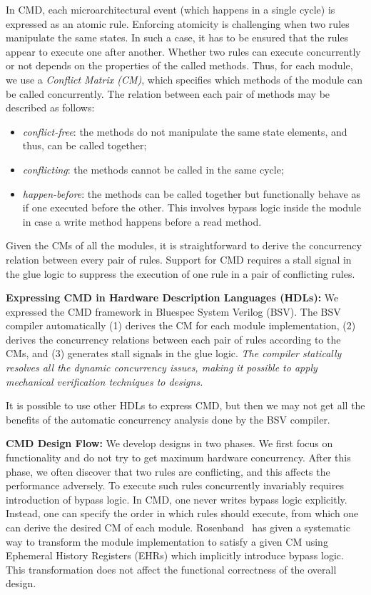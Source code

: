 \documentclass[conference]{IEEEtran}
\begin{document}
In CMD, each microarchitectural event (which happens in a single cycle) is expressed as an atomic rule.
Enforcing atomicity is challenging when two rules manipulate the same states.
In such a case, it has to be ensured that the rules appear to execute one after another.
Whether two rules can execute concurrently or not depends on the properties of the called methods.
Thus, for each module, we use a \emph{Conflict Matrix (CM)}, which specifies which methods of the module can be called concurrently.
The relation between each pair of methods may be described as follows:
\begin{itemize}
    \item \emph{conflict-free}: the methods do not manipulate the same state elements, and thus, can be called together;
    \item \emph{conflicting}: the methods cannot be called in the same cycle;
    \item \emph{happen-before}: the methods can be called together but functionally behave as if one executed before the other.
    This involves bypass logic inside the module in case a write method happens before a read method.
\end{itemize}
Given the CMs of all the modules, it is straightforward to derive the concurrency relation between every pair of rules.
Support for CMD requires a stall signal in the glue logic to suppress the execution of one rule in a pair of conflicting rules.

\noindent\textbf{Expressing CMD in Hardware Description Languages (HDLs):}
We expressed the CMD framework in Bluespec System Verilog (BSV).
The BSV compiler automatically (1) derives the CM for each module implementation, (2) derives the concurrency relations between each pair of rules according to the CMs, and (3) generates stall signals in the glue logic.
\emph{The compiler statically resolves all the dynamic concurrency issues, making it possible to apply mechanical verification  techniques to designs.}

It is possible to use other HDLs to express CMD, but then we may not get all the benefits of the automatic concurrency analysis done by the BSV compiler.

\noindent\textbf{CMD Design Flow:}
We develop designs in two phases.
We first focus on functionality and do not try to get maximum hardware concurrency.
After this phase, we often discover that two rules are conflicting, and this affects the performance adversely.
To execute such rules concurrently invariably requires introduction of bypass logic.
In CMD, one never writes bypass logic explicitly.
Instead, one can specify the order in which rules should execute, from which one can derive the desired CM of each module.
Rosenband~\cite{rosenband2004ephemeral} has given a systematic way to transform the module implementation to satisfy a given CM using Ephemeral History Registers (EHRs) which implicitly introduce bypass logic.
This transformation does not affect the functional correctness of the overall design.
\end{document}
